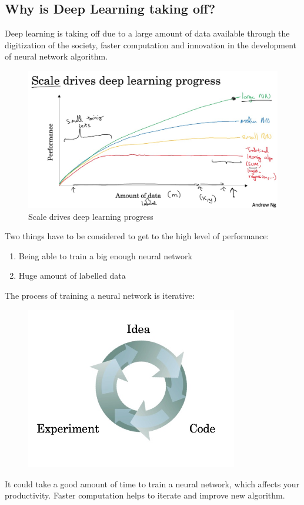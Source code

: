 \documentclass[UTF8]{article}
\begin{document}
\subsection{Why is Deep Learning taking off?}
Deep learning is taking off due to a large amount of data available through the digitization of the
society, faster computation and innovation in the development of neural network algorithm.
\begin{figure}[ht]
    \centering
    \includegraphics[width=40em]{figures/1-deep-nn-scale}
    \caption{Scale drives deep learning progress}
\end{figure}

Two things have to be considered to get to the high level of performance:
\begin{enumerate}
    \item Being able to train a big enough neural network
    \item Huge amount of labelled data
\end{enumerate}

The process of training a neural network is iterative:
\begin{figure}[ht]
    \centering
    \includegraphics[width=25em]{figures/1-train-nn-process}
\end{figure}

It could take a good amount of time to train a neural network, which affects your productivity.
Faster computation helps to iterate and improve new algorithm.
\end{document}
